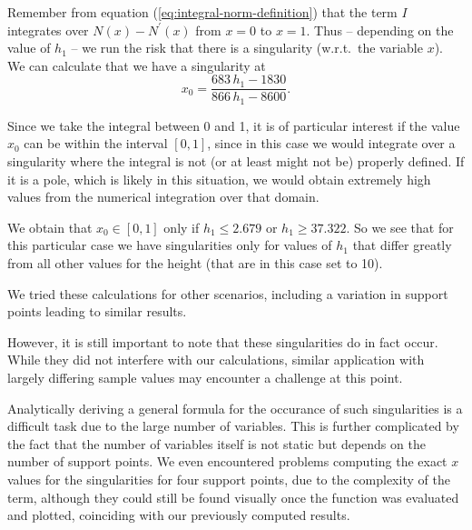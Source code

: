 \documentclass{article}
\begin{document}
Remember from equation (\ref{eq:integral-norm-definition}) that the term $I$ integrates over $N\left(x\right)-N^\prime\left(x\right)$ from $x=0$ to $x=1$. Thus -- depending on the value of $h_1$ -- we run the risk that there is a singularity (w.r.t.\, the variable $x$). We can calculate that we have a singularity at
\begin{equation*}
  x_0=\frac{683\, h_1 - 1830}{866\, h_1 - 8600}.
\end{equation*}

Since we take the integral between 0 and 1, it is of particular interest if the value $x_0$ can be within the interval $\left[ 0,1 \right]$, since in this case we would integrate over a singularity where the integral is not (or at least might not be) properly defined. If it is a pole, which is likely in this situation, we would obtain extremely high values from the numerical integration over that domain.

We obtain that $x_0 \in \left[ 0,1 \right]$ only if $h_1 \leq 2.679$ or $h_1 \geq 37.322$. So we see that for this particular case we have singularities only for values of $h_1$ that differ greatly from all other values for the height (that are in this case set to 10).

We tried these calculations for other scenarios, including a variation in support points leading to similar results.

However, it is still important to note that these singularities do in fact occur. While they did not interfere with our calculations, similar application with largely differing sample values may encounter a challenge at this point.

Analytically deriving a general formula for the occurance of such singularities is a difficult task due to the large number of variables. This is further complicated by the fact that the number of variables itself is not static but depends on the number of support points. We even encountered problems computing the exact $x$ values for the singularities for four support points, due to the complexity of the term, although they could still be found visually once the function was evaluated and plotted, coinciding with our previously computed results.

\newcommand{\fracsumme}{\mathtt{approx\_int}}

\end{document}
